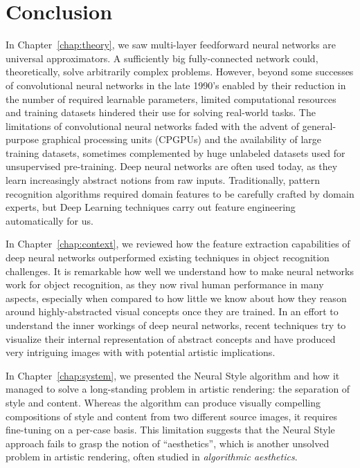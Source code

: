
\chapter{Conclusion}
\label{chap:conclusion}




In Chapter~\ref{chap:theory}, we saw multi-layer feedforward neural networks are universal approximators.
A sufficiently big fully-connected network could, theoretically, solve arbitrarily complex problems.
However, beyond some successes of convolutional neural networks in the late 1990's enabled by their reduction in the number of required learnable parameters, limited computational resources and training datasets hindered their use for solving real-world tasks.
The limitations of convolutional neural networks faded with the advent of general-purpose graphical processing units (CPGPUs) and the availability of large training datasets, sometimes complemented by huge unlabeled datasets used for unsupervised pre-training.
Deep neural networks are often used today, as they learn increasingly abstract notions from raw inputs.
Traditionally, pattern recognition algorithms required domain features to be carefully crafted by domain experts, but Deep Learning techniques carry out feature engineering automatically for us.

In Chapter~\ref{chap:context}, we reviewed how the feature extraction capabilities of deep neural networks outperformed existing techniques in object recognition challenges.
It is remarkable how well we understand how to make neural networks work for object recognition, as they now rival human performance in many aspects, especially when compared to how little we know about how they reason around highly-abstracted visual concepts once they are trained.
In an effort to understand the inner workings of deep neural networks, recent techniques try to visualize their internal representation of abstract concepts and have produced very intriguing images with with potential artistic implications.

In Chapter~\ref{chap:system}, we presented the Neural Style algorithm and how it managed to solve a long-standing problem in artistic rendering: the separation of style and content.
Whereas the algorithm can produce visually compelling compositions of style and content from two different source images, it requires fine-tuning on a per-case basis.
This limitation suggests that the Neural Style approach fails to grasp the notion of ``aesthetics'', which is another unsolved problem in artistic rendering, often studied in \emph{algorithmic aesthetics}.

